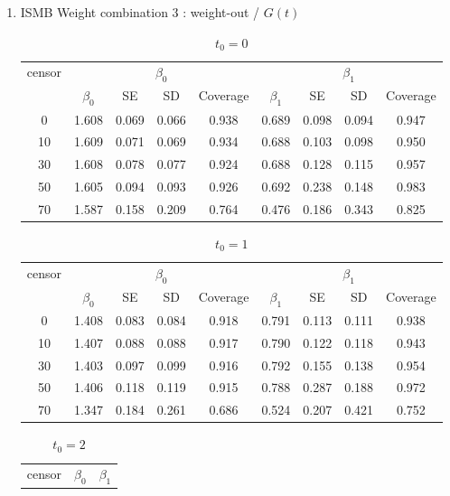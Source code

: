 \documentclass[12pt]{article}
\begin{document}
\begin{enumerate}
		\item{ISMB Weight combination 3 : weight-out / $G(t)$}
		\begin{table}[hbt!]
			\caption{$t_0=0$}
			\centering
			\begin{tabular}{|c|c|c|c|c|c|c|c|c|}
				\hline
				\multirow{2}{*}{censor} & \multicolumn{4}{c|}{$\beta_0$} & \multicolumn{4}{c|}{$\beta_1$}\\ \cline{2-9}
				& $\beta_0$ & SE & SD  & Coverage  & $\beta_1$ & SE & SD & Coverage\\
				\hline\hline
				0 & 1.608 & 0.069 & 0.066 & 0.938 & 0.689 & 0.098 & 0.094 & 0.947 \\ 
  10 & 1.609 & 0.071 & 0.069 & 0.934 & 0.688 & 0.103 & 0.098 & 0.950 \\ 
  30 & 1.608 & 0.078 & 0.077 & 0.924 & 0.688 & 0.128 & 0.115 & 0.957 \\ 
  50 & 1.605 & 0.094 & 0.093 & 0.926 & 0.692 & 0.238 & 0.148 & 0.983 \\ 
  70 & 1.587 & 0.158 & 0.209 & 0.764 & 0.476 & 0.186 & 0.343 & 0.825 \\ 
				\hline
			\end{tabular}
		\end{table}
		\begin{table}[hbt!]
			\caption{$t_0=1$}
			\centering
			\begin{tabular}{|c|c|c|c|c|c|c|c|c|}
				\hline
				\multirow{2}{*}{censor} & \multicolumn{4}{c|}{$\beta_0$} & \multicolumn{4}{c|}{$\beta_1$}\\ \cline{2-9}
				& $\beta_0$ & SE & SD  & Coverage  & $\beta_1$ & SE & SD & Coverage\\
				\hline\hline
				0 & 1.408 & 0.083 & 0.084 & 0.918 & 0.791 & 0.113 & 0.111 & 0.938 \\ 
  10 & 1.407 & 0.088 & 0.088 & 0.917 & 0.790 & 0.122 & 0.118 & 0.943 \\ 
  30 & 1.403 & 0.097 & 0.099 & 0.916 & 0.792 & 0.155 & 0.138 & 0.954 \\ 
  50 & 1.406 & 0.118 & 0.119 & 0.915 & 0.788 & 0.287 & 0.188 & 0.972 \\ 
  70 & 1.347 & 0.184 & 0.261 & 0.686 & 0.524 & 0.207 & 0.421 & 0.752 \\ 
				\hline
			\end{tabular}
		\end{table}
		\begin{table}[hbt!]
			\caption{$t_0=2$}
			\centering
			\begin{tabular}{|c|c|c|c|c|c|c|c|c|}
				\hline
				\multirow{2}{*}{censor} & \multicolumn{4}{c|}{$\beta_0$} & \multicolumn{4}{c|}{$\beta_1$}\\ \cline{2-9}

\end{tabular}
\end{table}
\end{enumerate}
\end{document}
